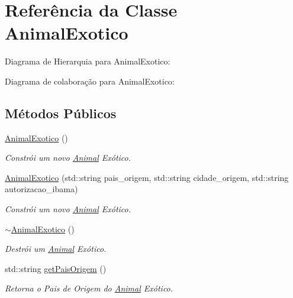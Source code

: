 \hypertarget{classAnimalExotico}{}\section{Referência da Classe Animal\+Exotico}
\label{classAnimalExotico}


Diagrama de Hierarquia para Animal\+Exotico\+:


Diagrama de colaboração para Animal\+Exotico\+:
\subsection*{Métodos Públicos}
\begin{DoxyCompactItemize}
\item 
\mbox{\label{classAnimalExotico_a7e24b8ba0b4a2a8675f20e12fe0efc21}} 
\hyperlink{classAnimalExotico_a7e24b8ba0b4a2a8675f20e12fe0efc21}{Animal\+Exotico} ()
\begin{DoxyCompactList}\small\item\em Constrói um novo \hyperlink{classAnimal}{Animal} Exótico. \end{DoxyCompactList}\item 
\hyperlink{classAnimalExotico_a3840065be138c7820007d1c2d33272c3}{Animal\+Exotico} (std\+::string pais\+\_\+origem, std\+::string cidade\+\_\+origem, std\+::string autorizacao\+\_\+ibama)
\begin{DoxyCompactList}\small\item\em Constrói um novo \hyperlink{classAnimal}{Animal} Exótico. \end{DoxyCompactList}\item 
\mbox{\label{classAnimalExotico_a3bce432a5e14f93e6d5254ce86075d36}} 
\hyperlink{classAnimalExotico_a3bce432a5e14f93e6d5254ce86075d36}{$\sim$\+Animal\+Exotico} ()
\begin{DoxyCompactList}\small\item\em Destrói um \hyperlink{classAnimal}{Animal} Exótico. \end{DoxyCompactList}\item 
std\+::string \hyperlink{classAnimalExotico_a656238e3c9891fb2f596fe2d022e1abf}{get\+Pais\+Origem} ()
\begin{DoxyCompactList}\small\item\em Retorna o Pais de Origem do \hyperlink{classAnimal}{Animal} Exótico. \end{DoxyCompactList}\item 

\end{DoxyCompactItemize}
